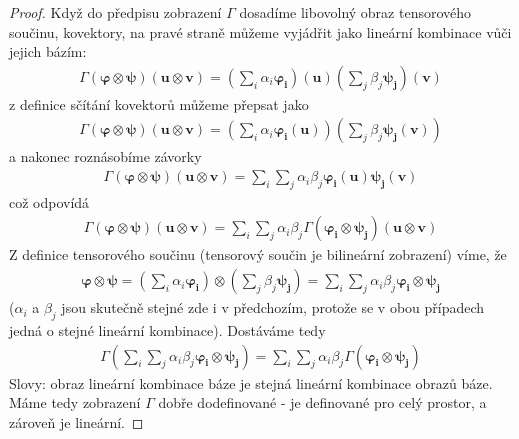 \documentclass[a5paper,12pt]{amsbook}
\theoremstyle{definition}
\newcommand{\myvec}[1]{\bm{#1}}
\begin{document}
\begin{proof}
Když do předpisu zobrazení $\Gamma$ dosadíme libovolný obraz tensorového součinu, kovektory,
na pravé straně můžeme vyjádřit jako lineární kombinace vůči jejich bázím:
\begin{equation*}
\begin{split}
\Gamma(\myvec{\varphi}\otimes\myvec{\psi})(\myvec{u}\otimes\myvec{v}) =
  \left(\sum_{i}\alpha_i\myvec{\varphi_i}\right)(\myvec{u})
  \left(\sum_{j}\beta_j\myvec{\psi_j}\right)(\myvec{v})
\end{split}
\end{equation*}
z definice sčítání kovektorů můžeme přepsat jako
\begin{equation*}
\begin{split}
\Gamma(\myvec{\varphi}\otimes\myvec{\psi})(\myvec{u}\otimes\myvec{v}) =
  \left(\sum_{i}\alpha_i\myvec{\varphi_i}(\myvec{u})\right)
  \left(\sum_{j}\beta_j\myvec{\psi_j}(\myvec{v})\right)
\end{split}
\end{equation*}
a nakonec roznásobíme závorky
\begin{equation*}
\begin{split}
\Gamma(\myvec{\varphi}\otimes\myvec{\psi})(\myvec{u}\otimes\myvec{v}) =
  \sum_{i}\sum_{j}\alpha_i\beta_j\myvec{\varphi_i}(\myvec{u})\myvec{\psi_j}(\myvec{v})
\end{split}
\end{equation*}
což odpovídá
\begin{equation*}
\begin{split}
\Gamma(\myvec{\varphi}\otimes\myvec{\psi})(\myvec{u}\otimes\myvec{v}) =
  \sum_{i}\sum_{j}\alpha_i\beta_j\Gamma(\myvec{\varphi_i}\otimes\myvec{\psi_j})(\myvec{u}\otimes\myvec{v})
\end{split}
\end{equation*}
Z definice tensorového součinu (tensorový součin je bilineární zobrazení) víme, že
\begin{equation*}
\begin{split}
\myvec{\varphi}\otimes\myvec{\psi} 
  = \left(\sum_i\alpha_i\myvec{\varphi_i}\right)\otimes\left(\sum_j\beta_j\myvec{\psi_j}\right)
  = \sum_i\sum_j\alpha_i\beta_j\myvec{\varphi_i}\otimes\myvec{\psi_j}
\end{split}
\end{equation*}
($\alpha_i$ a $\beta_j$ jsou skutečně stejné zde i v předchozím, protože se v obou případech jedná
o stejné lineární kombinace). Dostáváme tedy
\begin{equation*}
\begin{split}
\Gamma(\sum_i\sum_j\alpha_i\beta_j\myvec{\varphi_i}\otimes\myvec{\psi_j})
  = \sum_{i}\sum_{j}\alpha_i\beta_j\Gamma(\myvec{\varphi_i}\otimes\myvec{\psi_j})
\end{split}
\end{equation*}
Slovy: obraz lineární kombinace báze je stejná lineární kombinace obrazů báze. Máme tedy
zobrazení $\Gamma$ dobře dodefinované - je definované pro celý prostor, a zároveň je lineární.


\end{proof}
\end{document}
